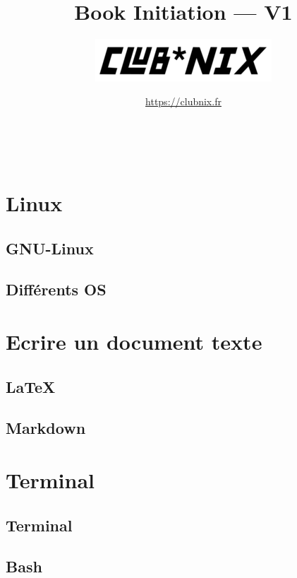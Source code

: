 \documentclass[a4paper, 12pt, titlepage]{article}
\begin{document}
\title{Book Initiation --- V1}
\author{\includegraphics{clubnix}}

\date{\url{https://clubnix.fr}}%

\maketitle

\tableofcontents

\newpage
~
\newpage

\section{Linux}
 \subsection{GNU-Linux}
    
 \subsection{Différents OS}
    

\newpage
\section{Ecrire un document texte}
  \subsection{LaTeX}
    
  \subsection{Markdown}
    

\newpage
\section{Terminal}
  \subsection{Terminal}
    
  \subsection{Bash}
    
\end{document}
